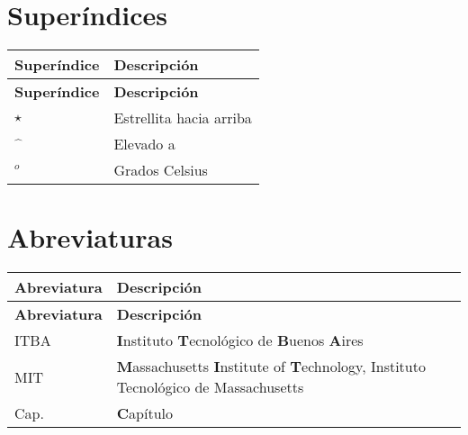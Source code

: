 \section*{Superíndices}
\begin{longtable}{>{\raggedright\arraybackslash}m{}>{\raggedright\arraybackslash}m{}}
	\textbf{Superíndice} & \textbf{Descripción} \\[0.5ex] \hline%
	\endfirsthead%
	\textbf{Superíndice} & \textbf{Descripción} \\[0.5ex] \hline%
	\endhead%
	$\star$ & Estrellita hacia arriba\\
	$\hat{\phantom{a}}$ & Elevado a\\
	$^{o}$ & Grados Celsius\\
\end{longtable}

\section*{Abreviaturas}
\begin{longtable}{>{\raggedright\arraybackslash}m{}>{\raggedright\arraybackslash}m{}}
	\textbf{Abreviatura} & \textbf{Descripción} \\[0.5ex] \hline%
	\endfirsthead%
	\textbf{Abreviatura} & \textbf{Descripción} \\[0.5ex] \hline%
	\endhead%
	ITBA & \textbf{I}nstituto \textbf{T}ecnológico de \textbf{B}uenos \textbf{A}ires\\
	MIT & \textbf{M}assachusetts \textbf{I}nstitute of \textbf{T}echnology, Instituto Tecnológico de Massachusetts\\
	Cap. & \textbf{C}apítulo\\
\end{longtable}